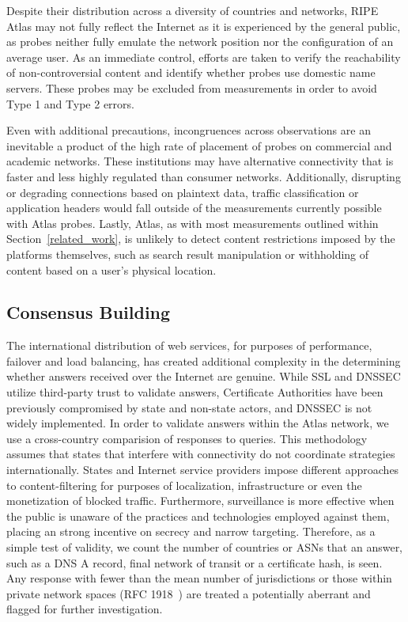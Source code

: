 Despite their distribution across a diversity of countries and networks, RIPE Atlas may not fully reflect the Internet as it is experienced by the general public, as probes neither fully emulate the network position nor the configuration of an average user. As an immediate control, efforts are taken to verify the reachability of non-controversial content and identify whether probes use domestic name servers. These probes may be excluded from measurements in order to avoid Type 1 and Type 2 errors.

Even with additional precautions, incongruences across observations are an inevitable a product of the high rate of placement of probes on commercial and academic networks. These institutions may have alternative connectivity that is faster and less highly regulated than consumer networks. Additionally, disrupting or degrading connections based on plaintext data, traffic classification or application headers would fall outside of the measurements currently possible with Atlas probes. Lastly, Atlas, as with most measurements outlined within Section~\ref{related_work}, is unlikely to detect content restrictions imposed by the platforms themselves, such as search result manipulation or withholding of content based on a user's physical location.

\subsection{Consensus Building}

The international distribution of web services, for purposes of performance, failover and load balancing, has created additional complexity in the determining whether answers received over the Internet are genuine. While SSL and DNSSEC utilize third-party trust to validate answers, Certificate Authorities have been previously compromised by state and non-state actors, and DNSSEC is not widely implemented. In order to validate answers within the Atlas network, we use a cross-country comparision of responses to queries. This methodology assumes that states that interfere with connectivity do not coordinate strategies internationally. States and Internet service providers impose different approaches to content-filtering for purposes of localization, infrastructure or even the monetization of blocked traffic. Furthermore, surveillance is more effective when the public is unaware of the practices and technologies employed against them, placing an strong incentive on secrecy and narrow targeting. Therefore, as a simple test of validity, we count the number of countries or ASNs that an answer, such as a DNS A record, final network of transit or a certificate hash, is seen. Any response with fewer than the mean number of jurisdictions or those within private network spaces (RFC 1918~\cite{rfc1918}) are treated a potentially aberrant and flagged for further investigation.

